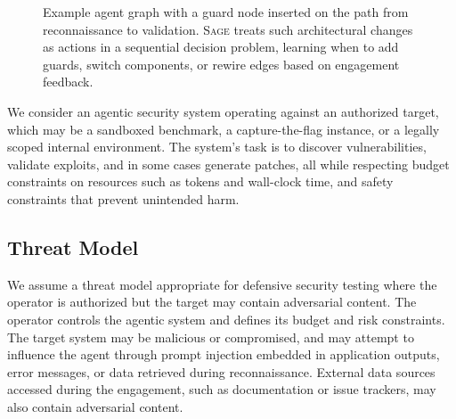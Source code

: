 \documentclass[sigconf,anonymous]{acmart}
\newcommand{\SAGE}{\textsc{Sage}\xspace}
\begin{document}
\begin{figure}[t]
\centering
{}
\caption{Example agent graph with a guard node inserted on the path from reconnaissance to validation. \SAGE treats such architectural changes as actions in a sequential decision problem, learning when to add guards, switch components, or rewire edges based on engagement feedback.}
\label{fig:architecture}
\end{figure}

We consider an agentic security system operating against an authorized target, which may be a sandboxed benchmark, a capture-the-flag instance, or a legally scoped internal environment. The system's task is to discover vulnerabilities, validate exploits, and in some cases generate patches, all while respecting budget constraints on resources such as tokens and wall-clock time, and safety constraints that prevent unintended harm.

\subsection{Threat Model}

We assume a threat model appropriate for defensive security testing where the operator is authorized but the target may contain adversarial content. The operator controls the agentic system and defines its budget and risk constraints. The target system may be malicious or compromised, and may attempt to influence the agent through prompt injection embedded in application outputs, error messages, or data retrieved during reconnaissance. External data sources accessed during the engagement, such as documentation or issue trackers, may also contain adversarial content.
\end{document}
